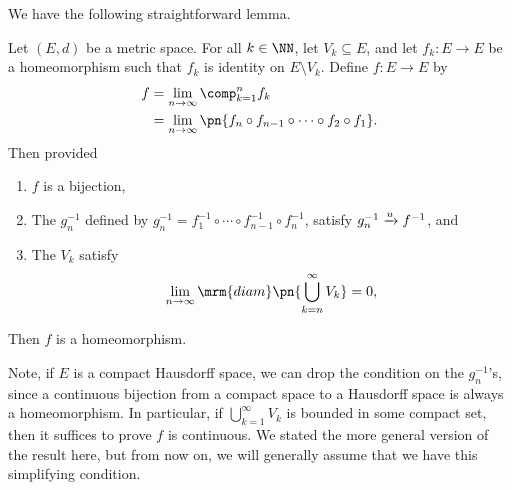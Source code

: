 We have the following straightforward lemma.
\begin{lemma}\label{lem:countable-homeomorphisms}
  Let $(E,d)$ be a metric space. For all $k\in\NN$, let $V_k \subseteq
  E$, and let $f_k : E \to E$ be a homeomorphism such that $f_k$ is
  identity on $E \setminus V_k$. Define $f : E \to E$ by
  \begin{align*}
    f
    &= \lim_{n\to\infty} \comp_{k=1}^n f_k \\
    &= \lim_{n\to\infty} \pn{f_n \circ f_{n-1} \circ \cdots \circ
      f_{2} \circ f_1}.
  \end{align*}
  Then provided
  \begin{enumerate}
    \item $f$ is a bijection,
    \item The $g^{-1}_n$ defined by $g_n^{-1} = f_1^{-1} \circ \cdots
      \circ f_{n-1}^{-1} \circ f_n^{-1}$, satisfy $g_n^{-1} \xrightarrow{u}
      f^{-1}$, and
    \item The $V_k$ satisfy
      \[
      \lim_{n\to\infty} \mrm{diam}\pn{\bigcup_{k=n}^\infty V_k} = 0,
      \]
  \end{enumerate}
  Then $f$ is a homeomorphism.
\end{lemma}
\begin{remark}
  Note, if $E$ is a compact Hausdorff space, we can drop the condition
  on the $g_n^{-1}$'s, since a continuous bijection from a compact
  space to a Hausdorff space is always a homeomorphism. In particular,
  if $\bigcup_{k=1}^\infty V_k$ is bounded in some compact set, then
  it suffices to prove $f$ is continuous. We stated the more general
  version of the result here, but from now on, we will generally
  assume that we have this simplifying condition.
\end{remark}
